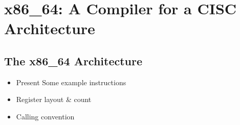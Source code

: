 \section{x86\_64: A Compiler for a CISC Architecture}

\subsection{The x86\_64 Architecture}

\begin{itemize}
	\item Present Some example instructions
	\item Register layout \& count
	\item Calling convention
\end{itemize}
